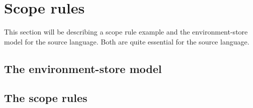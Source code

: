 \chapter{Scope rules}\label{chap:scope-rules}
This section will be describing a scope rule example and the environment-store model for the source language. Both are quite essential for the source language.

\section{The environment-store model}\label{sec:es-model}


\section{The scope rules}\label{sec:scope-rules}
